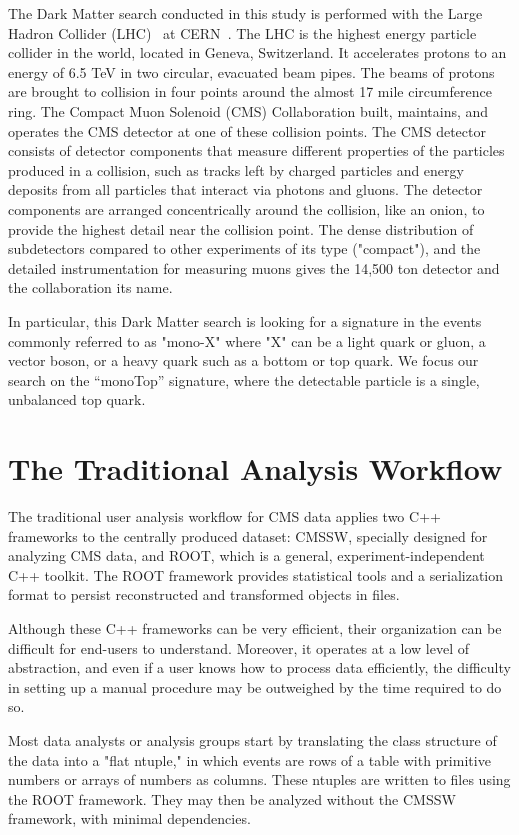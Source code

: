 \documentclass[a4paper]{jpconf}
\begin{document}
The Dark Matter search conducted in this study is performed with the Large Hadron Collider (LHC)~\cite{lhc} at CERN~\cite{cern}. The LHC is the highest energy particle collider in the world, located in Geneva, Switzerland. It accelerates protons to an energy of 6.5 TeV in two circular, evacuated beam pipes. The beams of protons are brought to collision in four points around the almost 17 mile circumference ring. The Compact Muon Solenoid (CMS) Collaboration built, maintains, and operates the CMS detector at one of these collision points. The CMS detector consists of detector components that measure different properties of the particles produced in a collision, such as tracks left by charged particles and energy deposits from all particles that interact via photons and gluons. The detector components are arranged concentrically around the collision, like an onion, to provide the highest detail near the collision point. The dense distribution of subdetectors compared to other experiments of its type ("compact"), and the detailed instrumentation for measuring muons gives the 14,500 ton detector and the collaboration its name.

In particular, this Dark Matter search is looking for a signature in the events commonly referred to as "mono-X" where "X" can be a light quark or gluon, a vector boson, or a heavy quark such as a bottom or top quark. We focus our search on the “monoTop” signature, where the detectable particle is a single, unbalanced top quark.

\section{The Traditional Analysis Workflow}

The traditional user analysis workflow for CMS data applies two C++ frameworks to the centrally produced dataset: CMSSW, specially designed for analyzing CMS data, and ROOT, which is a general, experiment-independent C++ toolkit. The ROOT framework provides statistical tools and a serialization format to persist reconstructed and transformed objects in files.

Although these C++ frameworks can be very efficient, their organization can be difficult for end-users to understand. Moreover, it operates at a low level of abstraction, and even if a user knows how to process data efficiently, the difficulty in setting up a manual procedure may be outweighed by the time required to do so.

Most data analysts or analysis groups start by translating the class structure of the data into a "flat ntuple," in which events are rows of a table with primitive numbers or arrays of numbers as columns. These ntuples are written to files using the ROOT framework. They may then be analyzed without the CMSSW framework, with minimal dependencies.
\end{document}
